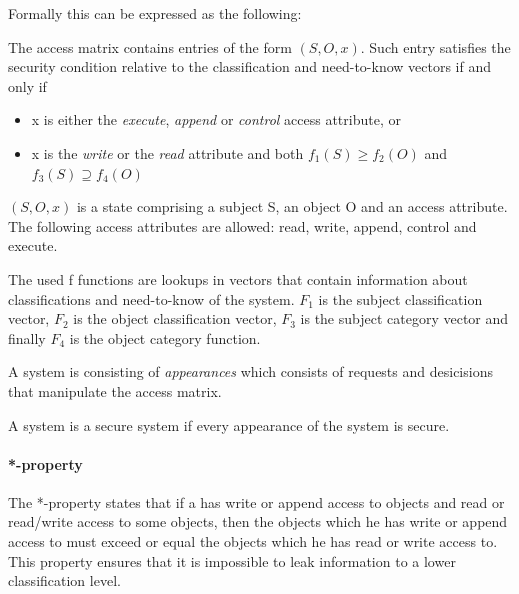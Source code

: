 Formally this can be expressed as the following:
\begin{definition}
The access matrix contains entries of the form $(S,O,x)$.
 Such entry satisfies the security condition relative to the classification and need-to-know vectors if and only if

\begin{itemize}
\item x is either the \emph{execute}, \emph{append} or \emph{control} access attribute, or
\item x is the \emph{write} or the \emph{read} attribute and both $f_1(S) \ge f_2(O)$ and $f_3(S) \supseteq f_4(O)$
\end{itemize}

 $(S,O,x)$ is a state comprising a subject S, an object O and an access attribute.
 The following access attributes are allowed: read, write, append, control and execute.

 The used f functions are lookups in vectors that contain information about classifications and need-to-know of the system.
 $F_1$ is the subject classification vector, $F_2$ is the object classification vector, $F_3$ is the subject category vector and finally $F_4$ is the object category function.

A system is consisting of \emph{appearances} which consists of requests and desicisions that manipulate the access matrix.

A system is a secure system if every appearance of the system is secure.
\end{definition}

\paragraph{*-property}
The *-property states that if a \principal{} has write or append access to objects and read or read/write access to some objects, then the objects which he has write or append access to must exceed or equal the objects which he has read or write access to.
This property ensures that it is impossible to leak information to a lower classification level.


